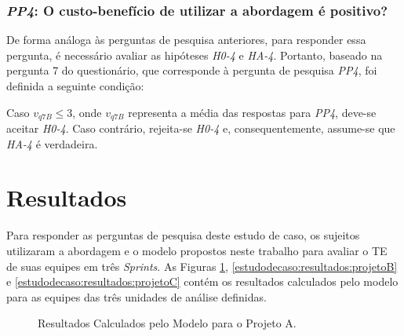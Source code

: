 \subsubsection{\textit{PP4}: O custo-benefício de utilizar a abordagem é positivo?}

De forma análoga às perguntas de pesquisa anteriores, para responder essa pergunta, é necessário avaliar as hipóteses \textit{H0-4} e \textit{HA-4}. Portanto, baseado na pergunta 7 do questionário, que corresponde à pergunta de pesquisa \textit{PP4}, foi definida a seguinte condição:

Caso $v_{q7B} \le 3$, onde $v_{q7B}$ representa a média das respostas para \textit{PP4}, deve-se aceitar \textit{H0-4}. Caso contrário, rejeita-se \textit{H0-4} e, consequentemente, assume-se que \textit{HA-4} é verdadeira.

\section{Resultados}
\label{estudodecaso:resultados}

Para responder as perguntas de pesquisa deste estudo de caso, os sujeitos utilizaram a abordagem e o modelo propostos neste trabalho para avaliar o TE de suas equipes em três \textit{Sprints}. As Figuras \ref{estudodecaso:resultados:projetoA}, \ref{estudodecaso:resultados:projetoB} e \ref{estudodecaso:resultados:projetoC} contém os resultados calculados pelo modelo para as equipes das três unidades de análise definidas.

\begin{figure}[ht!]
\begin{center}
	\end{center}
	\caption{Resultados Calculados pelo Modelo para o Projeto A.}
	\label{estudodecaso:resultados:projetoA}
\end{figure}

